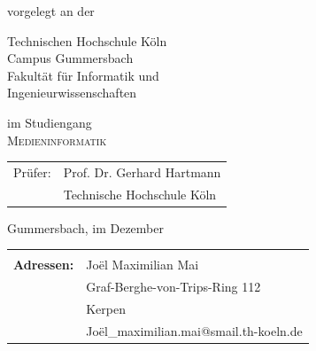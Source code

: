 \begin{titlepage}
\begin{center}
\vspace{0.6cm}

\begin{large}
vorgelegt an der\\ 
\vspace{0.2cm}
\begin{scshape}
Technischen Hochschule Köln\\
Campus Gummersbach\\
Fakultät für Informatik und\\
Ingenieurwissenschaften\\
\end{scshape}
\end{large}

\vspace{0.6cm}

\begin{large}
im Studiengang\\ 
\vspace{0.1cm}
\textsc{Medieninformatik}
\end{large}


\vspace{1.2cm}

\begin{tabular}{rl}
        Prüfer:  &  Prof. Dr. Gerhard Hartmann\\
       					&  \small Technische Hochschule Köln \\[1.0em]
\end{tabular}

\vspace{1.2cm}

\begin{large}
Gummersbach, im Dezember \the\year
\end{large}

\end{center}

\newpage
\thispagestyle{empty}

\begin{center}
\begin{tabular}{rl}
							&  \\[26.0em]
							
\large \textbf{Adressen:}	&  	\quad Joël Maximilian Mai\\
							&  	\quad Graf-Berghe-von-Trips-Ring 112\\
							&	\quad 50169 Kerpen\\
							&  	\quad Joël\_maximilian.mai@smail.th-koeln.de\\[2.0em]
							

\end{tabular}
\end{center}
\end{titlepage}
